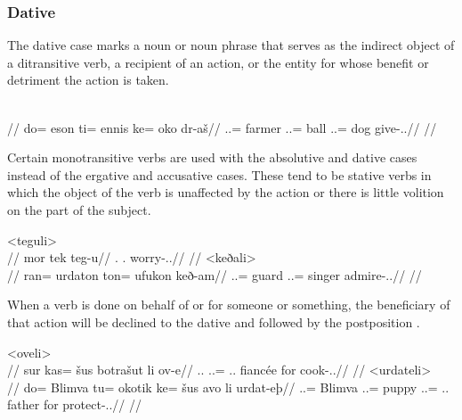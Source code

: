 \subsubsection{Dative}
\label{subsubsec:tvk-nouns-dative}

The dative case marks a noun or noun phrase that serves as the indirect object of a ditransitive verb, a recipient of an action, or the entity for whose benefit or detriment the action is taken.

	\begingl
		\glpreamble{}\\
		//
		\gla do= eson ti= ennis ke= oko dr-aš//
		\glb \An.\Sg.\Erg= farmer \In.\Sg.\Acc= ball \An.\Sg.\Dat= dog give-\Ind.\Npst.\Rtsp//
		\glft{}//
	\endgl
\xe

Certain monotransitive verbs are used with the absolutive and dative cases instead of the ergative and accusative cases. These tend to be stative verbs in which the object of the verb is unaffected by the action or there is little volition on the part of the subject.

	\a<teguli>\begingl
		\glpreamble{}\\
		//
		\gla mor tek teg-u//
		\glb \Fps.\Abs{} \Sps.\Dat{} worry-\Ind.\Npst.\Ipfv//
		\glft{}//
	\endgl
	\a<keðali>\begingl
		\glpreamble{}\\
		//
		\gla ran= urdaton ton= ufukon keð-am//
		\glb \An.\Pl.\Abs= guard \An.\Pl.\Dat= singer admire-\Ind.\Pst.\Ipfv//
		\glft{}//
	\endgl
\xe

When a verb is done on behalf of or for someone or something, the beneficiary of that action will be declined to the dative and followed by the postposition   .

	\a<oveli>\begingl
		\glpreamble{}\\
		//
		\gla sur kas= šus botrašut li ov-e//
		\glb \Tps.\An.\Abs{} \An.\Pc.\Dat= \Tps.\An.\Gen{} fiancée for cook-\Ind.\Npst.\Ipfv//
		\glft{}//
	\endgl
	\a<urdateli>\begingl
		\glpreamble{}\\
		//
		\gla do= Blimva tu= okotik ke= šus avo li urdat-eþ//
		\glb \An.\Sg.\Erg= Blimva \An.\Sg.\Acc= puppy \An.\Sg.\Dat= \Tps.\An.\Gen{} father for protect-\Ind.\Npst.\Prg//
		\glft{}//
	\endgl
\xe

